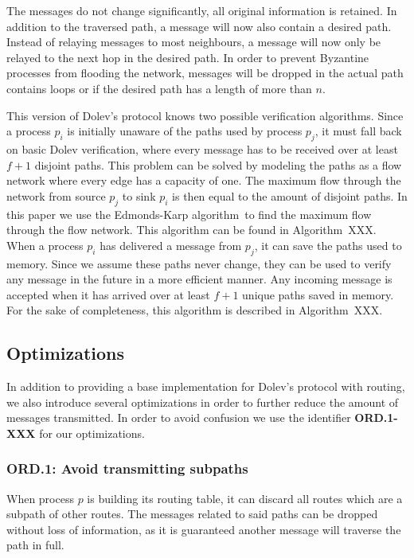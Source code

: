 The messages do not change significantly, all original information is retained. In addition to the traversed path, a message will now also contain a desired path. Instead of relaying messages to most neighbours, a message will now only be relayed to the next hop in the desired path. In order to prevent Byzantine processes from flooding the network, messages will be dropped in the actual path contains loops or if the desired path has a length of more than $n$.

This version of Dolev's protocol knows two possible verification algorithms. 
Since a process $p_i$ is initially unaware of the paths used by process $p_j$, it must fall back on basic Dolev verification, where every message has to be received over at least $f+1$ disjoint paths. This problem can be solved by modeling the paths as a flow network where every edge has a capacity of one. The maximum flow through the network from source $p_j$ to sink $p_i$ is then equal to the amount of disjoint paths. In this paper we use the Edmonds-Karp algorithm~\citationneeded to find the maximum flow through the flow network. This algorithm can be found in Algorithm~XXX.
When a process $p_i$ has delivered a message from $p_j$, it can save the paths used to memory. Since we assume these paths never change, they can be used to verify any message in the future in a more efficient manner. Any incoming message is accepted when it has arrived over at least $f+1$ unique paths saved in memory. For the sake of completeness, this algorithm is described in Algorithm~XXX.

\subsection{Optimizations}
In addition to providing a base implementation for Dolev's protocol with routing, we also introduce several optimizations in order to further reduce the amount of messages transmitted. In order to avoid confusion we use the identifier \textbf{ORD.1-XXX} for our optimizations.

\subsubsection{ORD.1: Avoid transmitting subpaths}
When process $p$ is building its routing table, it can discard all routes which are a subpath of other routes. The messages related to said paths can be dropped without loss of information, as it is guaranteed another message will traverse the path in full.

